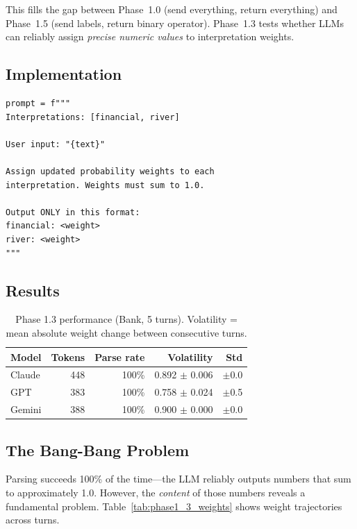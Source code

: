 \documentclass[11pt,a4paper]{article}
\begin{document}
This fills the gap between Phase~1.0 (send everything, return everything) and
Phase~1.5 (send labels, return binary operator). Phase~1.3 tests whether LLMs
can reliably assign \textit{precise numeric values} to interpretation weights.

\subsection{Implementation}

\begin{lstlisting}
prompt = f"""
Interpretations: [financial, river]

User input: "{text}"

Assign updated probability weights to each
interpretation. Weights must sum to 1.0.

Output ONLY in this format:
financial: <weight>
river: <weight>
"""
\end{lstlisting}

\subsection{Results}

\begin{table}[ht]
\centering
\begin{tabular}{lrrrr}
\toprule
\textbf{Model} & \textbf{Tokens} & \textbf{Parse rate} & \textbf{Volatility} & \textbf{Std} \\
\midrule
Claude & 448 & 100\% & 0.892 $\pm$ 0.006 & $\pm$0.0 \\
GPT & 383 & 100\% & 0.758 $\pm$ 0.024 & $\pm$0.5 \\
Gemini & 388 & 100\% & 0.900 $\pm$ 0.000 & $\pm$0.0 \\
\bottomrule
\end{tabular}
\caption{Phase 1.3 performance (Bank, 5 turns). Volatility = mean absolute weight
change between consecutive turns.}
\label{tab:phase1_3}
\end{table}

\subsection{The Bang-Bang Problem}

Parsing succeeds 100\% of the time---the LLM reliably outputs numbers that sum
to approximately 1.0. However, the \textit{content} of those numbers reveals a
fundamental problem. Table~\ref{tab:phase1_3_weights} shows weight trajectories
across turns.
\end{document}
